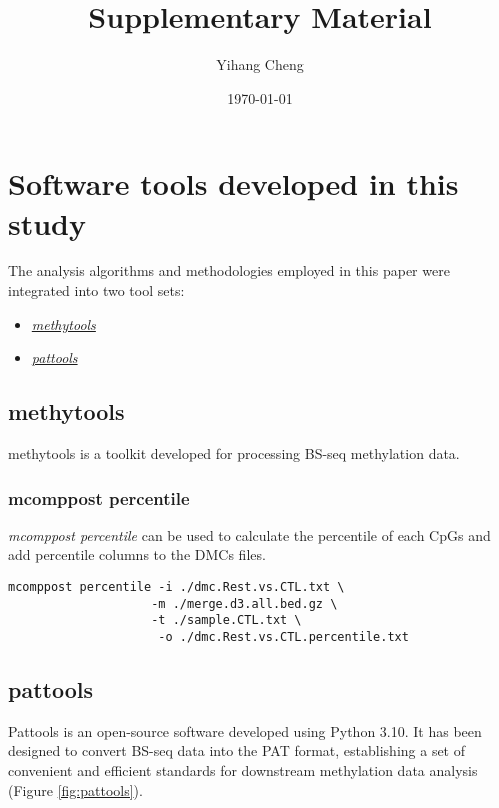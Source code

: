 \documentclass[12pt,letterpaper]{article}
\title{Supplementary Material}
\author{Yihang Cheng}
\date{\today}
\begin{document}
\maketitle
\newpage
\tableofcontents
\newpage
\section{Software tools developed in this study}\label{sec:software-develope}
The analysis algorithms and methodologies employed in this paper were integrated into two tool sets:

\begin{itemize}
    \item  \href{https://github.com/hcyvan/epiLungCancer/tree/main/methytools}{\textit{methytools}}
    \item \href{https://github.com/hcyvan/pattools}{\textit{pattools}}
\end{itemize}

\subsection{methytools}\label{sec:software-develope-methytools}

methytools is a toolkit developed for processing BS-seq methylation data.

\subsubsection{mcomppost percentile}

\emph{mcomppost percentile} can be used to calculate the percentile of each CpGs and add percentile columns to the DMCs files.

\begin{verbatim}
mcomppost percentile -i ./dmc.Rest.vs.CTL.txt \
                    -m ./merge.d3.all.bed.gz \
                    -t ./sample.CTL.txt \
                     -o ./dmc.Rest.vs.CTL.percentile.txt
\end{verbatim}

\subsection{pattools}\label{sec:software-develope-pattools}


Pattools is an open-source software developed using Python 3.10. It has been designed to convert
BS-seq data into the PAT format\cite{Loyfer2024.05.08.593132}, establishing a set of convenient
and efficient standards for downstream methylation data analysis (Figure \ref*{fig:pattools}). 
\end{document}
